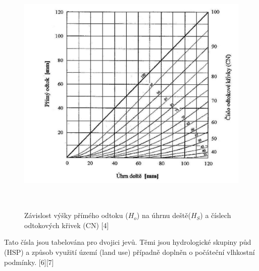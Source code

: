 \documentclass[a4paper,oneside,12pt]{book}
\begin{document}
\begin{figure}[ht] \label{obr1}
\centering
\includegraphics[height=12cm]{pictures/CNcurves.jpg}
\caption{ Závislost výšky přímého odtoku ($H_{o}$) na úhrnu deště($H_{S}$) a číslech odtokových křivek (CN) [4]}
\label{fig:example}
\end{figure}

 \hspace{10mm} Tato čísla jsou tabelována pro dvojici jevů. Těmi jsou hydrologické skupiny půd (HSP) a způsob využití území (land use) případně doplněn o počáteční vlhkostní podmínky. [6][7]
\end{document}
